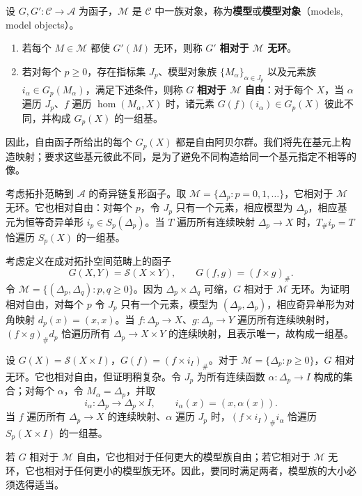 设 $G,G':\mathcal C\to\mathcal A$ 为函子，$\mathcal M$ 是 $\mathcal C$ 中一族对象，称为\textbf{模型}或\textbf{模型对象}（models, model objects）。
\begin{enumerate}[label=(\arabic*)]
\item 若每个 $M\in\mathcal M$ 都使 $G'(M)$ 无环，则称 $G'$ \textbf{相对于 $\mathcal M$ 无环}。
\item 若对每个 $p\ge0$，存在指标集 $J_p$、模型对象族 $\{M_\alpha\}_{\alpha\in J_p}$ 以及元素族 $i_\alpha\in G_p(M_\alpha)$，满足下述条件，则称 $G$ \textbf{相对于 $\mathcal M$ 自由}：对于每个 $X$，当 $\alpha$ 遍历 $J_p$、$f$ 遍历 $\operatorname{hom}(M_\alpha,X)$ 时，诸元素 $G(f)(i_\alpha)\in G_p(X)$ 彼此不同，并构成 $G_p(X)$ 的一组基。
\end{enumerate}
因此，自由函子所给出的每个 $G_p(X)$ 都是自由阿贝尔群。我们将先在基元上构造映射；要求这些基元彼此不同，是为了避免不同构造给同一个基元指定不相等的像。

考虑拓扑范畴到 $\mathcal A$ 的奇异链复形函子。取 $\mathcal M=\{\Delta_p:p=0,1,\ldots\}$，它相对于 $\mathcal M$ 无环。它也相对自由：对每个 $p$，令 $J_p$ 只有一个元素，相应模型为 $\Delta_p$，相应基元为恒等奇异单形 $i_p\in S_p(\Delta_p)$。当 $T$ 遍历所有连续映射 $\Delta_p\to X$ 时，$T_\#i_p=T$ 恰遍历 $S_p(X)$ 的一组基。

考虑定义在成对拓扑空间范畴上的函子
\[
G(X,Y)=\mathcal S(X\times Y),\qquad G(f,g)=(f\times g)_\#.
\]
令 $\mathcal M=\{(\Delta_p,\Delta_q):p,q\ge0\}$。因为 $\Delta_p\times\Delta_q$ 可缩，$G$ 相对于 $\mathcal M$ 无环。为证明相对自由，对每个 $p$ 令 $J_p$ 只有一个元素，模型为 $(\Delta_p,\Delta_p)$，相应奇异单形为对角映射 $d_p(x)=(x,x)$。当 $f:\Delta_p\to X$、$g:\Delta_p\to Y$ 遍历所有连续映射时，$(f\times g)_\#d_p$ 恰遍历所有 $\Delta_p\to X\times Y$ 的连续映射，且表示唯一，故构成一组基。

设 $G(X)=\mathcal S(X\times I)$，$G(f)=(f\times i_I)_\#$。对于 $\mathcal M=\{\Delta_p:p\ge0\}$，$G$ 相对无环。它也相对自由，但证明稍复杂。令 $J_p$ 为所有连续函数 $\alpha:\Delta_p\to I$ 构成的集合；对每个 $\alpha$，令 $M_\alpha=\Delta_p$，并取
\[
i_\alpha:\Delta_p\to\Delta_p\times I,\qquad i_\alpha(x)=(x,\alpha(x)).
\]
当 $f$ 遍历所有 $\Delta_p\to X$ 的连续映射、$\alpha$ 遍历 $J_p$ 时，$(f\times i_I)_\#i_\alpha$ 恰遍历 $S_p(X\times I)$ 的一组基。

若 $G$ 相对于 $\mathcal M$ 自由，它也相对于任何更大的模型族自由；若它相对于 $\mathcal M$ 无环，它也相对于任何更小的模型族无环。因此，要同时满足两者，模型族的大小必须选得适当。

